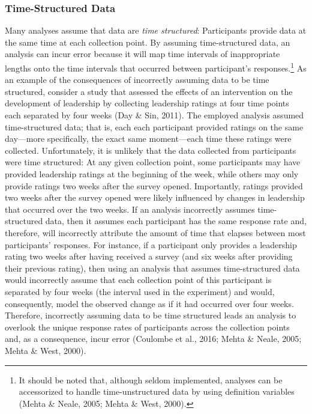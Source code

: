 \documentclass[
12pt, %
twoside,
english]{guelphthesis}
\theoremstyle{definition}
\theoremstyle{definition}
\theoremstyle{definition}
\theoremstyle{definition}
\theoremstyle{remark}
\begin{document}
\hypertarget{time-structured-data}{%
\subsubsection{Time-Structured Data}\label{time-structured-data}}



Many analyses assume that data are \emph{time structured}: Participants provide data at the same time at each collection point. By assuming time-structured data, an analysis can incur error because it will map time intervals of inappropriate lengths onto the time intervals that occurred between participant's responses.\footnote{It should be noted that, although seldom implemented, analyses can be accessorized to handle time-unstructured data by using definition variables (Mehta \& Neale, 2005; Mehta \& West, 2000).} As an example of the consequences of incorrectly assuming data to be time structured, consider a study that assessed the effects of an intervention on the development of leadership by collecting leadership ratings at four time points each separated by four weeks (Day \& Sin, 2011). The employed analysis assumed time-structured data; that is, each each participant provided ratings on the same day---more specifically, the exact same moment---each time these ratings were collected. Unfortunately, it is unlikely that the data collected from participants were time structured: At any given collection point, some participants may have provided leadership ratings at the beginning of the week, while others may only provide ratings two weeks after the survey opened. Importantly, ratings provided two weeks after the survey opened were likely influenced by changes in leadership that occurred over the two weeks. If an analysis incorrectly assumes time-structured data, then it assumes each participant has the same response rate and, therefore, will incorrectly attribute the amount of time that elapses between most participants' responses. For instance, if a participant only provides a leadership rating two weeks after having received a survey (and six weeks after providing their previous rating), then using an analysis that assumes time-structured data would incorrectly assume that each collection point of this participant is separated by four weeks (the interval used in the experiment) and would, consequently, model the observed change as if it had occurred over four weeks. Therefore, incorrectly assuming data to be time structured leads an analysis to overlook the unique response rates of participants across the collection points and, as a consequence, incur error (Coulombe et al., 2016; Mehta \& Neale, 2005; Mehta \& West, 2000).
\end{document}
